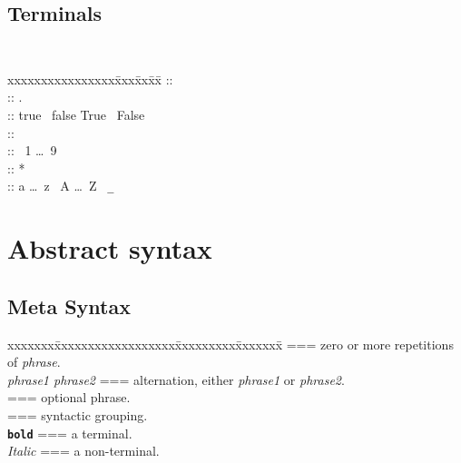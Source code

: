 \subsection{Terminals}
{\tt
\begin{tabbing}
xxxxxxxxxxxxxxxx\= xxx\= xx\=  xx\= \kill
\IntegerConstant \>::\>\> \Opt{-} \Number\\
\RealConstant \>::\>\> \Opt{-} \Number .\Number\\
\BooleanConstant \>::\>\> true \Alt\ false \Alt True \Alt\ False\\
\Number \>::\>\> \Digit \Digit *\\
\Digit \>::\> \Alt\ 1 \Alt\ldots\Alt\ 9\\
\Identifier \>::\>\> \Letter \Group{\Letter \Alt\ \Digit} *\\
\Letter \>::\>\> a \Alt\ldots\Alt\ z  \Alt\ A \Alt\ldots\Alt\ Z \Alt\ \verb'_'\\
\end{tabbing}
}



\section{{\Alpha} Abstract syntax}
\label{alpha2}

\subsection{Meta Syntax}
\begin{tabbing}
xxxxxxx\= xxxxxxxxxxxxxxxxxx\= xxxxxxxxx\= xxxxxxx\= \kill
{} \>===\>  zero or more repetitions of {\sl phrase}.\\
\> {\sl phrase1 {\sl \Alt} phrase2} \>===\> alternation, either {\sl
phrase1} or {\sl phrase2}.\\
\>  [\ldots] \>===\> optional phrase.\\
\> \Group{\ldots} \>===\> syntactic grouping.\\
\> {\bf \tt bold} \>===\> a terminal.\\
\> {\sl Italic} \>===\> a non-terminal.\\
\end{tabbing}

